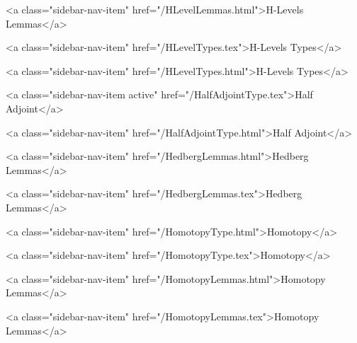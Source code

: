       
        
          <a class="sidebar-nav-item" href="/HLevelLemmas.html">H-Levels Lemmas</a>
        
      
    
      
        
          <a class="sidebar-nav-item" href="/HLevelTypes.tex">H-Levels Types</a>
        
      
    
      
        
          <a class="sidebar-nav-item" href="/HLevelTypes.html">H-Levels Types</a>
        
      
    
      
        
          <a class="sidebar-nav-item active" href="/HalfAdjointType.tex">Half Adjoint</a>
        
      
    
      
        
          <a class="sidebar-nav-item" href="/HalfAdjointType.html">Half Adjoint</a>
        
      
    
      
        
          <a class="sidebar-nav-item" href="/HedbergLemmas.html">Hedberg Lemmas</a>
        
      
    
      
        
          <a class="sidebar-nav-item" href="/HedbergLemmas.tex">Hedberg Lemmas</a>
        
      
    
      
        
          <a class="sidebar-nav-item" href="/HomotopyType.html">Homotopy</a>
        
      
    
      
        
          <a class="sidebar-nav-item" href="/HomotopyType.tex">Homotopy</a>
        
      
    
      
        
          <a class="sidebar-nav-item" href="/HomotopyLemmas.html">Homotopy Lemmas</a>
        
      
    
      
        
          <a class="sidebar-nav-item" href="/HomotopyLemmas.tex">Homotopy Lemmas</a>
        
      
    
